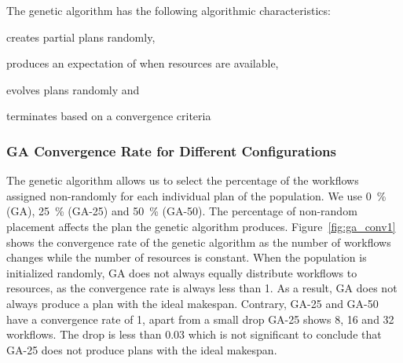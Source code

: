 The genetic algorithm has the following algorithmic characteristics:
\begin{inparaenum}[1)]
    \item creates partial plans randomly,
    \item produces an expectation of when resources are available,
    \item evolves plans randomly and
    \item terminates based on a convergence criteria
\end{inparaenum}

\subsubsection*{GA Convergence Rate for Different Configurations}
The genetic algorithm allows us to select the percentage of the workflows
assigned non-randomly for each individual plan of the population. We use 0~\%
(GA), 25~\% (GA-25) and 50~\% (GA-50). The percentage of non-random placement
affects the plan the genetic algorithm produces. Figure~\ref{fig:ga_conv1}
shows the convergence rate of the genetic algorithm as the number of workflows
changes while the number of resources is constant. When the population is
initialized randomly, GA does not always equally distribute workflows to
resources, as the convergence rate is always less than 1. As a result, GA does
not always produce a plan with the ideal makespan. Contrary, GA-25 and GA-50
have a convergence rate of 1, apart from a small drop GA-25 shows 8, 16 and 32
workflows. The drop is less than 0.03 which is not significant to conclude
that GA-25 does not produce plans with the ideal makespan.

